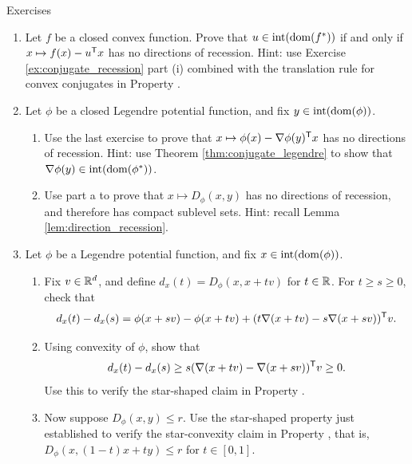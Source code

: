 \begin{xcb}{Exercises}
\begin{enumerate}[label=\thechapter.\arabic*]
\settowidth{\leftmargini}{00.00.\hskip\labelsep}
\item Let $f$ be a closed convex function. Prove that $u \in
  \operatorname{int}(\operatorname{dom}(f^*))$ if and only if $x \mapsto f(x) - u^{\mathsf{T}} x$ has no
  directions of recession. Hint: use Exercise \ref{ex:conjugate_recession} part
  (i) combined with the translation rule for convex conjugates in Property
  .  

\item \label{ex:bregman_first} 
  Let $\phi$ be a closed Legendre potential function, and fix $y \in
  \operatorname{int}(\operatorname{dom}(\phi))$. 

\begin{enumerate}[label=\alph*.]
\item Use the last exercise to prove that $x \mapsto \phi(x) - \nabla\phi(y)^{\mathsf{T}}
  x$ has no directions of recession. Hint: use Theorem
  \ref{thm:conjugate_legendre} to show that $\nabla\phi(y) \in
  \operatorname{int}(\operatorname{dom}(\phi^*))$. 

\item Use part a to prove that $x \mapsto D_\phi(x,y)$ has no directions of
  recession, and therefore has compact sublevel sets. Hint: recall Lemma
  \ref{lem:direction_recession}. 
\end{enumerate}

\item \label{ex:bregman_second}
  Let $\phi$ be a Legendre potential function, and fix $x \in
  \operatorname{int}(\operatorname{dom}(\phi))$.

\begin{enumerate}[label=\alph*.]
\item Fix $v \in \mathbb{R}^d$, and define $d_x(t) = D_\phi(x, x+tv)$ for $t \in \mathbb{R}$.
  For $t \geq s \geq 0$, check that   
  \[
  d_x(t) - d_x(s) = \phi(x+sv) - \phi(x+tv) + (t\nabla(x+tv) - s\nabla(x+sv))^{\mathsf{T}}
  v. 
  \]

\item Using convexity of $\phi$, show that 
  \[
  d_x(t) - d_x(s) \geq s (\nabla(x+tv) - \nabla(x+sv))^{\mathsf{T}} v \geq 0. 
  \]
  Use this to verify the star-shaped claim in Property
  .   

\item Now suppose $D_\phi(x,y) \leq r$. Use the star-shaped property just
  established to verify the star-convexity claim in Property
  , that is, $D_\phi(x, (1-t) x + ty) \leq r$ for $t
  \in [0,1]$.   
\end{enumerate}


\end{enumerate}
\end{xcb}
